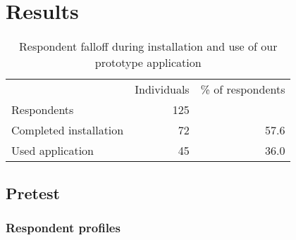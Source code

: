 \section{Results}


\begin{table}[h]
  \begin{tabular}{lrr}

    &
    \multicolumn{1}{c}{Individuals} &
    \multicolumn{1}{c}{\% of respondents} \\

    \cmidrule(lr){2-2}
    \cmidrule(lr){3-3}

    Respondents &
    125 &
    \\

    Completed installation &
    72 &
    57.6 \\

    Used application &
    45 &
    36.0 \\

  \end{tabular}
  \caption[Respondents Falloff]{%
    Respondent falloff during installation and use of our prototype
    application}
  \label{table:respondents.falloff}
\end{table}

\subsection{Pretest}

\subsubsection{Respondent profiles}

